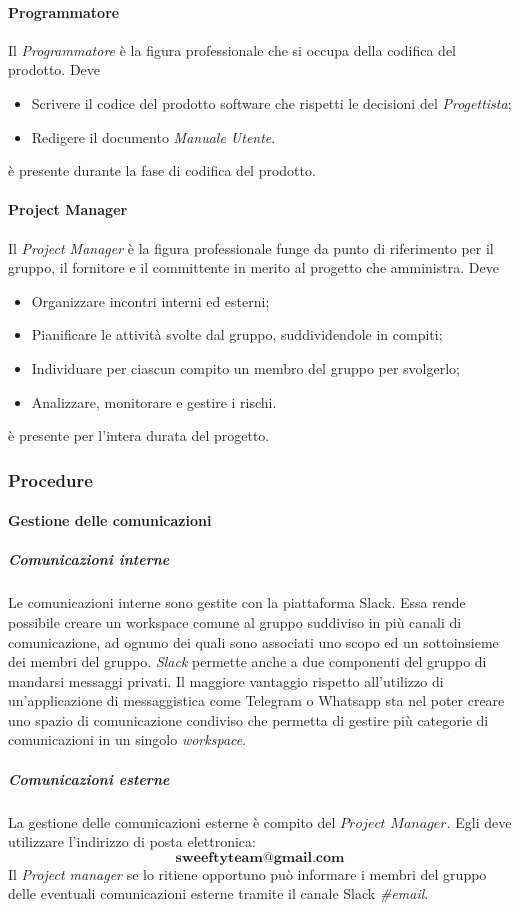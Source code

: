 		\paragraph{Programmatore} \Spazio
		Il \emph{Programmatore} è la figura professionale che si occupa della codifica del prodotto. Deve
		\begin{itemize}
			\item Scrivere il codice  del prodotto software che rispetti le decisioni del \emph{Progettista};
			\item Redigere il documento \emph{Manuale Utente}.
		\end{itemize}
		è presente durante la fase di codifica del prodotto.
		\paragraph{Project Manager} \Spazio
		Il \emph{Project Manager} è la figura professionale funge da punto di riferimento per il gruppo, il fornitore e il committente in merito al progetto che amministra. Deve
		\begin{itemize}
			\item Organizzare incontri interni ed esterni;
			\item Pianificare le attività svolte dal gruppo, suddividendole in compiti;
			\item Individuare per ciascun compito un membro del gruppo per svolgerlo;
			\item Analizzare, monitorare e gestire i rischi.
		\end{itemize}
		è presente per l'intera durata del progetto.
	\subsubsection{Procedure}
		\paragraph{Gestione delle comunicazioni}
			\subparagraph{Comunicazioni interne} \Spazio
			\label{comInterne}
			Le comunicazioni interne sono gestite con la piattaforma Slack. Essa rende possibile creare un workspace comune al gruppo suddiviso in più canali di comunicazione, ad ognuno dei quali sono associati uno scopo ed un sottoinsieme dei membri del gruppo. \emph{Slack} permette anche a due componenti del gruppo di mandarsi messaggi privati. Il maggiore vantaggio rispetto all'utilizzo di un'applicazione di messaggistica come Telegram o Whatsapp sta nel poter creare uno spazio di comunicazione condiviso che permetta di gestire più categorie di comunicazioni in un singolo \emph{workspace}. %
			\subparagraph{Comunicazioni esterne} \Spazio
			 La gestione delle comunicazioni esterne è compito del $Project$ $Manager$. Egli deve utilizzare l'indirizzo di posta elettronica:
			$$\textbf{sweeftyteam@gmail.com}$$
			Il \emph{Project manager} se lo ritiene opportuno può informare i membri del gruppo delle eventuali comunicazioni esterne tramite il canale Slack \emph{\#email}.
			
